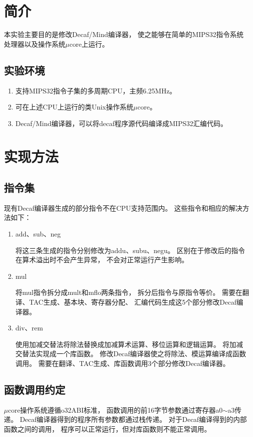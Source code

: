 \section{简介}
    本实验主要目的是修改Decaf/Mind编译器，%
    使之能够在简单的MIPS32指令系统处理器以及操作系统$\mu$core上运行。
    \subsection*{实验环境}
    \begin{enumerate}
        \item
        支持MIPS32指令子集的多周期CPU，主频6.25MHz。
        \item
        可在上述CPU上运行的类Unix操作系统$\mu$core。
        \item
        Decaf/Mind编译器，可以将decaf程序源代码编译成MIPS32汇编代码。
    \end{enumerate}

\section{实现方法}
    \subsection{指令集}
        现有Decaf编译器生成的部分指令不在CPU支持范围内。%
        这些指令和相应的解决方法如下：
        \begin{enumerate}
        \item
        add、sub、neg
            
        将这三条生成的指令分别修改为addu、subu、negu。%
        区别在于修改后的指令在算术溢出时不会产生异常，%
        不会对正常运行产生影响。
        \item
        mul

        将mul指令拆分成mult和mflo两条指令，%
        拆分后指令与原指令等价。%
        需要在翻译、TAC生成、基本块、寄存器分配、%
        汇编代码生成这5个部分修改Decaf编译器。
        \item
        div、rem

        使用加减交替法将除法替换成加减算术运算、移位运算和逻辑运算。%
        将加减交替法实现成一个库函数。%
        修改Decaf编译器使之将除法、模运算编译成函数调用。%
        需要在翻译、TAC生成、库函数调用3个部分修改Decaf编译器。
        \end{enumerate}

    \subsection{函数调用约定}
        $\mu$core操作系统遵循o32ABI标准，%
        函数调用的前16字节参数通过寄存器a0$\sim$a3传递。%
        Decaf编译器得到的程序所有参数都通过栈传递。%
        对于Decaf编译得到的内部函数之间的调用，%
        程序可以正常运行，但对库函数则不能正常调用。

